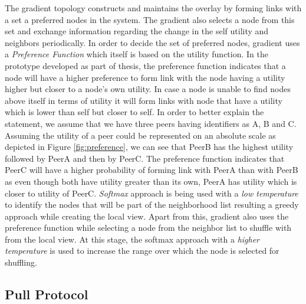 \documentclass[a4paper,11pt]{kth-mag}
\begin{document}
\par The gradient topology constructs and maintains the overlay by forming links with a set a preferred nodes in the system. The gradient also selects a node from this set and exchange information regarding the change in the self utility and neighbors periodically. In order to decide the set of preferred nodes, gradient uses a \textit{Preference Function} which itself is based on the utility function. In the prototype developed as part of thesis, the preference function indicates that a node will have a higher preference to form link with the node having a utility higher but closer to a node's own utility. In case a node is unable to find nodes above itself in terms of utility it will form links with node that have a utility which is lower than self but closer to self. In order to better explain the statement, we assume that we have three peers having identifiers as A, B and C. Assuming the utility of a peer could be represented on an absolute scale as depicted in Figure \ref{fig:preference}, we can see that PeerB has the highest utility  followed by PeerA and then by PeerC. The preference function indicates that PeerC will have a higher probability of forming link with PeerA than with PeerB as even though both have utility greater than its own, PeerA has utility which is closer to utility of PeerC. \textit{Softmax} approach is being used with a \textit{low temperature} to identify the nodes that will be part of the neighborhood list resulting a greedy approach while creating the local view. Apart from this, gradient also uses the  preference function while selecting a node from the neighbor list to shuffle with from the local view. At this stage, the softmax approach with a \textit{higher temperature} is used to increase the range over which the node is selected for shuffling.


\subsection{Pull Protocol}
\end{document}
